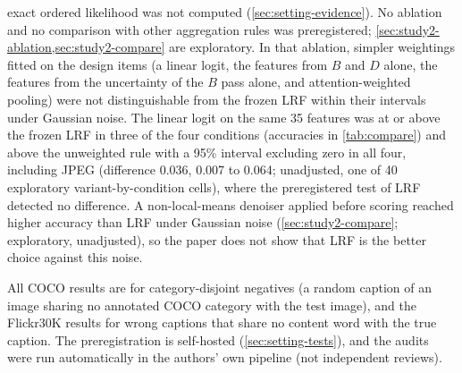 exact ordered likelihood was not computed (\cref{sec:setting-evidence}).
No ablation and no comparison with other aggregation rules was preregistered; \cref{sec:study2-ablation,sec:study2-compare} are exploratory.
In that ablation, simpler weightings fitted on the design items (a linear logit, the features from $B$ and $D$ alone, the features from
the uncertainty of the $B$ pass alone, and attention-weighted pooling) were not distinguishable from the frozen LRF within their intervals under Gaussian noise.
The linear logit on the same 35 features was at or above the frozen LRF in three of the four conditions (accuracies in \cref{tab:compare}) and above the unweighted rule with a 95\% interval excluding zero in all four, including JPEG (difference 0.036, 0.007 to 0.064; unadjusted, one of 40 exploratory variant-by-condition cells), where the preregistered test of LRF detected no difference.
A non-local-means denoiser applied before scoring reached higher accuracy than LRF under Gaussian noise (\cref{sec:study2-compare}; exploratory, unadjusted), so the paper does not show that LRF is the better choice against this noise.

All COCO results are for category-disjoint negatives (a random caption of an image sharing no annotated COCO category with the test image), and the Flickr30K results for wrong captions that share no content word with the true caption.
The preregistration is self-hosted (\cref{sec:setting-tests}), and the audits were run automatically in the authors' own pipeline (not independent reviews).

